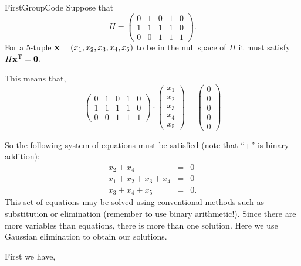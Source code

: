 \begin{example}{FirstGroupCode}
Suppose that
\[
H =
\left(
\begin{array}{ccccc}
0 & 1 & 0 & 1 & 0 \\
1 & 1 & 1 & 1 & 0 \\
0 & 0 & 1 & 1 & 1
\end{array}
\right).
\]
For a 5-tuple ${\bold x} = (x_1, x_2, x_3, x_4, x_5)$ to be in
the null space of $H$ it must satisfy $H{\bold x}^\textrm{T} = {\bold 0}$. 

This means that,
\[
\left(
\begin{array}{ccccc}
0 & 1 & 0 & 1 & 0 \\
1 & 1 & 1 & 1 & 0 \\
0 & 0 & 1 & 1 & 1
\end{array}
\right)\cdot
\left(
\begin{array}{c}
x_1 \\
x_2\\
x_3\\
x_4\\
x_5
\end{array}
\right)
=
\left(
\begin{array}{c}
0\\
0\\
0\\
0\\
0
\end{array}
\right)
\]

So the following system of equations must be satisfied (note that ``+'' is binary addition):   
\begin{eqnarray*}
 x_2 + x_4   & = & 0 \\
x_1 + x_2 + x_3 + x_4  & = & 0 \\
 x_3 + x_4 + x_5 & = & 0.
\end{eqnarray*}
This set of equations may be solved using conventional methods such as substitution or elimination  (remember to use binary arithmetic!). Since there are more variables than equations, there is more than one solution. Here we use Gaussian elimination to obtain our solutions.

First we have,


\end{example}
